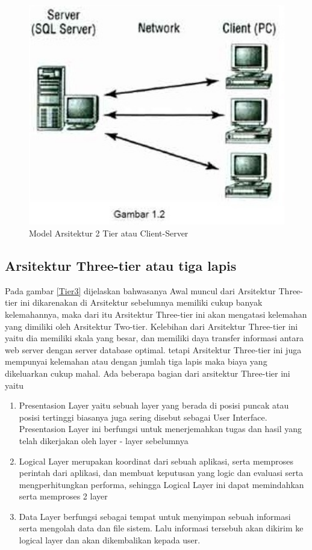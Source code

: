 \begin{figure}[ht]
    \centerline{\includegraphics[width=1\textwidth]{figures/2model2tier.jpg}}
    \caption{Model Arsitektur 2 Tier atau Client-Server}
    \label{Tier2}
\end{figure}

\subsection{Arsitektur Three-tier atau tiga lapis}
    Pada gambar \ref{Tier3} dijelaskan bahwasanya Awal muncul dari Arsitektur Three-tier ini dikarenakan 
di Arsitektur sebelumnya memiliki cukup banyak kelemahannya, maka dari itu Arsitektur Three-tier ini akan mengatasi kelemahan yang 
dimiliki oleh Arsitektur Two-tier. Kelebihan dari Arsitektur Three-tier ini yaitu dia memiliki skala yang besar, dan memiliki daya 
transfer informasi antara web server dengan server database optimal. tetapi Arsitektur Three-tier ini juga mempunyai kelemahan atau dengan jumlah tiga lapis maka biaya yang dikeluarkan cukup mahal. Ada beberapa bagian dari arsitektur Three-tier ini yaitu 

	\begin{enumerate}
		\item Presentasion Layer yaitu sebuah layer yang berada di posisi puncak atau posisi tertinggi biasanya juga sering disebut
		         sebagai User Interface. Presentasion Layer ini berfungsi untuk menerjemahkan tugas dan hasil yang telah dikerjakan
		         oleh layer - layer sebelumnya
		\item Logical Layer merupakan koordinat dari sebuah aplikasi, serta memproses perintah dari aplikasi, dan membuat
		         keputusan yang logic dan evaluasi serta mengperhitungkan performa, sehingga Logical Layer ini dapat memindahkan
		         serta memproses 2 layer
		\item Data Layer berfungsi sebagai tempat untuk menyimpan sebuah informasi serta mengolah data dan file sistem. Lalu
		         informasi tersebuh akan dikirim ke logical layer dan akan dikembalikan kepada user.
	\end{enumerate}

